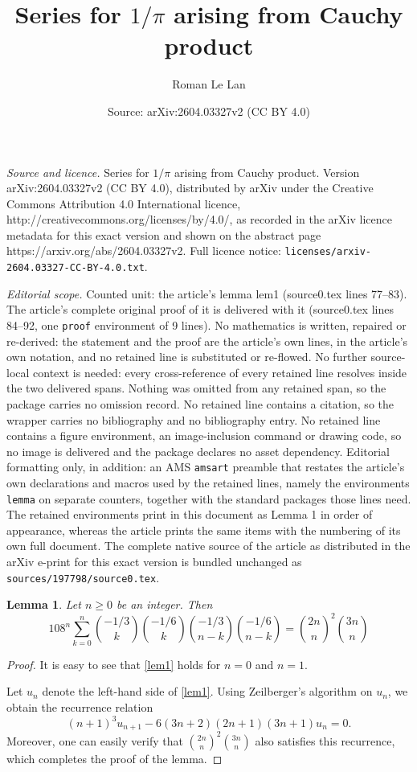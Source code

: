 \documentclass[10pt,a4paper]{amsart}
\title{Series for $1/\pi$ arising from Cauchy product}
\author{Roman Le Lan}
\date{Source: arXiv:2604.03327v2 (CC BY 4.0)}
\newtheorem{lemma}{Lemma}
\begin{document}
\maketitle

\noindent\emph{Source and licence.} Series for $1/\pi$ arising from Cauchy product. Version arXiv:2604.03327v2 (CC BY 4.0), distributed by arXiv under the Creative Commons Attribution 4.0 International licence, http://creativecommons.org/licenses/by/4.0/, as recorded in the arXiv licence metadata for this exact version and shown on the abstract page https://arxiv.org/abs/2604.03327v2. Full licence notice: \texttt{licenses/arxiv-2604.03327-CC-BY-4.0.txt}.\par\smallskip

\noindent\textit{Editorial scope.} Counted unit: the article's lemma lem1 (source0.tex lines 77--83). The article's complete original proof of it is delivered with it (source0.tex lines 84--92, one \texttt{proof} environment of 9 lines). No mathematics is written, repaired or re-derived: the statement and the proof are the article's own lines, in the article's own notation, and no retained line is substituted or re-flowed.  No further source-local context is needed: every cross-reference of every retained line resolves inside the two delivered spans.  Nothing was omitted from any retained span, so the package carries no omission record.  No retained line contains a citation, so the wrapper carries no bibliography and no bibliography entry.  No retained line contains a figure environment, an image-inclusion command or drawing code, so no image is delivered and the package declares no asset dependency.  Editorial formatting only, in addition: an AMS \texttt{amsart} preamble that restates the article's own declarations and macros used by the retained lines, namely the environments \texttt{lemma} on separate counters, together with the standard packages those lines need.  The retained environments print in this document as Lemma 1 in order of appearance, whereas the article prints the same items with the numbering of its own full document.  The complete native source of the article as distributed in the arXiv e-print for this exact version is bundled unchanged as \texttt{sources/197798/source0.tex}.
\begin{lemma}
    Let $n\ge0$ be an integer. Then
    \begin{equation}
    108^n\sum_{k=0}^n\binom{-1/3}{k}\binom{-1/6}{k}\binom{-1/3}{n-k}\binom{-1/6}{n-k}=\binom{2n}{n}^2\binom{3n}{n}
    \label{lem1}
    \end{equation}
\end{lemma}

\begin{proof}
    It is easy to see that \eqref{lem1} holds for $n=0$ and $n=1$.
    
Let $u_n$ denote the left-hand side of \eqref{lem1}. Using Zeilberger's algorithm on $u_n$, we obtain the recurrence relation
\[
(n+1)^3 u_{n+1} - 6(3n+2)(2n+1)(3n+1) u_n = 0.
\]
Moreover, one can easily verify that $\binom{2n}{n}^2 \binom{3n}{n}$ also satisfies this recurrence, which completes the proof of the lemma.
\end{proof}
\end{document}

